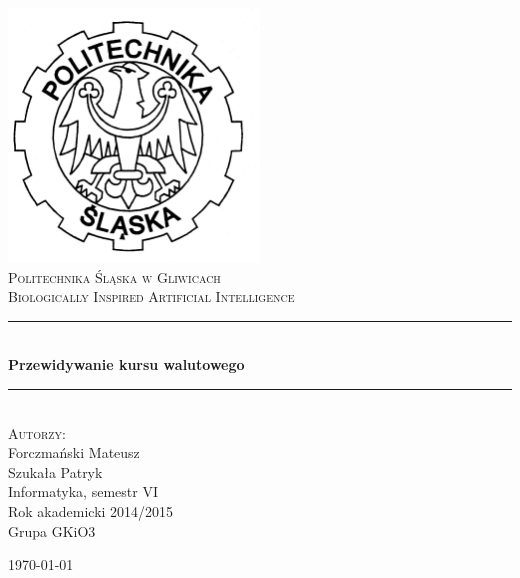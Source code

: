 \documentclass[a4paper]{article}
\newcommand{\HRule}{\rule{\linewidth}{0.5mm}}
\begin{document}


	\begin{titlepage}
		\begin{center}
			
			\includegraphics[width=0.5\textwidth]{./img/logo.png}~\\[1cm]
			
			\textsc{\LARGE Politechnika Śląska w Gliwicach}\\[1.5cm]
			
			\textsc{\Large Biologically Inspired Artificial Intelligence}\\[0.5cm]
			
			\HRule \\[0.4cm]
			{ \huge \bfseries Przewidywanie kursu walutowego  \\[0.4cm] }
			
			\HRule \\[1.5cm]
			
			\textsc{\Large Autorzy:} \\
			Forczmański Mateusz \\
			Szukała Patryk\\[1.0cm]
			
			Informatyka, semestr VI \\
			Rok akademicki 2014/2015 \\
			Grupa GKiO3
			
			\vfill
			
			{\large \today}
			
		\end{center}
	\end{titlepage}
	{\hypersetup{hidelinks}
		\tableofcontents
	}
	\newpage
	
\end{document}
